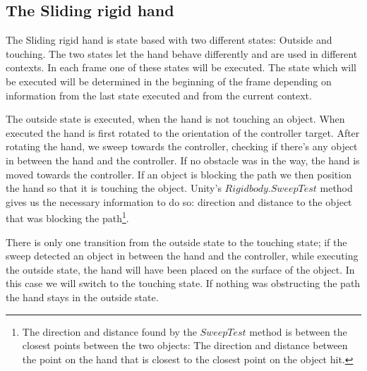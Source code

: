 \subsection{The Sliding rigid hand}
\label{subsec:slidingRigidHand}
The Sliding rigid hand is state based with two different states: Outside and touching. The two states let the hand behave differently and are used in different contexts. In each frame one of these states will be executed. The state which will be executed will be determined in the beginning of the frame depending on information from the last state executed and from the current context.


The outside state is executed, when the hand is not touching an object. When executed the hand is first rotated to the orientation of the controller target. After rotating the hand, we sweep towards the controller, checking if there's any object in between the hand and the controller. If no obstacle was in the way, the hand is moved towards the controller. If an object is blocking the path we then position the hand so that it is touching the object. Unity's $Rigidbody.SweepTest$ method gives us the necessary information to do so: direction and distance to the object that was blocking the path\footnote{The direction and distance found by the $SweepTest$ method is between the closest points between the two objects: The direction and distance between the point on the hand that is closest to the closest point on the object hit.}.

There is only one transition from the outside state to the touching state; if the sweep detected an object in between the hand and the controller, while executing the outside state, the hand will have been placed on the surface of the object. In this case we will switch to the touching state. If nothing was obstructing the path the hand stays in the outside state.

